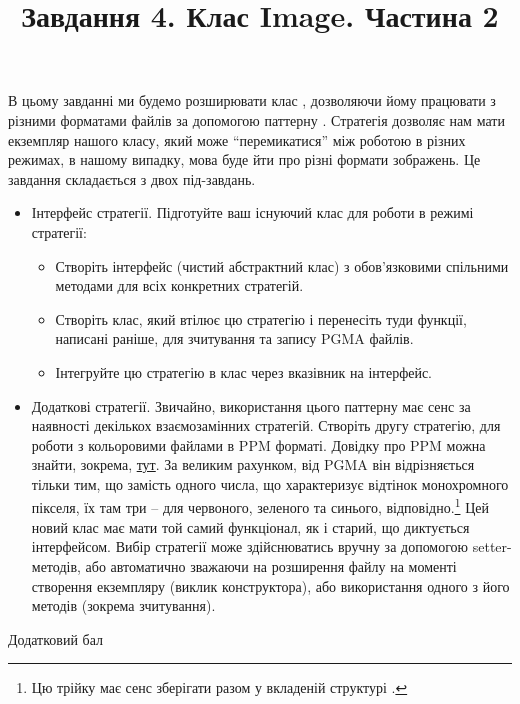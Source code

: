\documentclass[12pt]{article}
\title{Завдання 4. Клас Image. Частина 2}
\begin{document}
\maketitle
В цьому завданні ми будемо розширювати клас , дозволяючи йому працювати з різними форматами файлів за допомогою паттерну \href{https://refactoring.guru/uk/design-patterns/strategy/cpp/example}{}. Стратегія дозволяє нам мати екземпляр нашого класу, який може ``перемикатися'' між роботою в різних режимах, в нашому випадку, мова буде йти про різні формати зображень. Це завдання складається з двох під-завдань.

\begin{itemize}
  \item Інтерфейс стратегії.
    Підготуйте ваш існуючий клас  для роботи в режимі стратегії:
    \begin{itemize}
      \item Створіть інтерфейс (чистий абстрактний клас) з обов'язковими спільними методами для всіх конкретних стратегій.
      \item Створіть клас, який втілює цю стратегію і перенесіть туди функції, написані раніше, для зчитування та запису PGMA файлів.
      \item Інтегруйте цю стратегію в клас  через вказівник на інтерфейс.
    \end{itemize}

  \item Додаткові стратегії.
  Звичайно, використання цього паттерну має сенс за наявності декількох взаємозамінних стратегій. Створіть другу стратегію, для роботи з кольоровими файлами в PPM форматі. Довідку про PPM можна знайти, зокрема, \href{https://people.sc.fsu.edu/~jburkardt/data/ppma/ppma.html}{тут}. За великим рахунком, від PGMA він відрізняється тільки тим, що замість одного числа, що характеризує відтінок монохромного пікселя, їх там три -- для червоного, зеленого та синього, відповідно.\footnote{Цю трійку має сенс зберігати разом у вкладеній структурі .} Цей новий клас має мати той самий функціонал, як і старий, що диктується інтерфейсом. Вибір стратегії може здійснюватись вручну за допомогою setter-методів, або автоматично зважаючи на розширення файлу на моменті створення екземпляру  (виклик конструктора), або використання одного з його методів (зокрема зчитування).

\end{itemize}

\newpage
\begin{center}
    \large{Додатковий бал}
\end{center}
\end{document}
